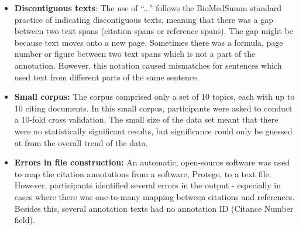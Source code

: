 \documentclass[11pt]{article}
\begin{document}
\begin{itemize}
\vspace{-.3cm}
\item \textbf{Discontiguous texts}: The use of ``...''  follows the BioMedSumm standard practice of indicating discontiguous texts, meaning that there was a gap between two text spans (citation spans or reference spans). The gap might be because text moves onto a new page. Sometimes there was a formula, page number or figure between two text spans which is not a part of the annotation. However, this notation caused mismatches for sentences which used text from different parts of the same sentence.
\vspace{-.3cm}
\item \textbf{Small corpus:} The corpus comprised only a set of 10 topics, each with up to 10 citing documents. In this small
  corpus, participants were asked to conduct a 10-fold cross validation. The small size of the data set meant that there were no
  statistically significant results, but significance could only be guessed at from the overall trend of the data.
\vspace{-.3cm}
\item \textbf{Errors in file construction:} An automatic, open-source software was used to map the citation annotations from a software, Protege, to a text file.  However, participants identified several errors in the output - especially in cases where there was one-to-many mapping between citations and references.  Besides this, several annotation texts had no annotation ID (Citance Number field).
\end{itemize}

%
\end{document}
